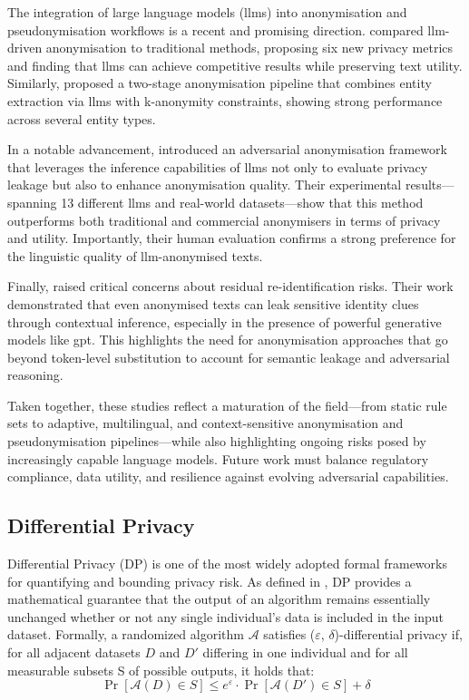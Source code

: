 The integration of large language models (\glspl{llm}) into anonymisation and pseudonymisation workflows is a recent and promising direction. \citet{pissarra2024llm} compared \gls{llm}-driven anonymisation to traditional methods, proposing six new privacy metrics and finding that \glspl{llm} can achieve competitive results while preserving text utility. Similarly, \citet{jia2025twostage} proposed a two-stage anonymisation pipeline that combines entity extraction via \glspl{llm} with k-anonymity constraints, showing strong performance across several entity types.

In a notable advancement, \citet{staabLargeLanguageModels2025} introduced an adversarial anonymisation framework that leverages the inference capabilities of \glspl{llm} not only to evaluate privacy leakage but also to enhance anonymisation quality. Their experimental results—spanning 13 different \glspl{llm} and real-world datasets—show that this method outperforms both traditional and commercial anonymisers in terms of privacy and utility. Importantly, their human evaluation confirms a strong preference for the linguistic quality of \gls{llm}-anonymised texts.

Finally, \citet{patsakis2023gpt} raised critical concerns about residual re-identification risks. Their work demonstrated that even anonymised texts can leak sensitive identity clues through contextual inference, especially in the presence of powerful generative models like \gls{gpt}. This highlights the need for anonymisation approaches that go beyond token-level substitution to account for semantic leakage and adversarial reasoning.

Taken together, these studies reflect a maturation of the field—from static rule sets to adaptive, multilingual, and context-sensitive anonymisation and pseudonymisation pipelines—while also highlighting ongoing risks posed by increasingly capable language models. Future work must balance regulatory compliance, data utility, and resilience against evolving adversarial capabilities.

\subsection{Differential Privacy}
Differential Privacy (DP) is one of the most widely adopted formal frameworks for quantifying and bounding privacy risk. As defined in \citet{dwork2014algorithmic}, DP provides a mathematical guarantee that the output of an algorithm remains essentially unchanged whether or not any single individual’s data is included in the input dataset. Formally, a randomized algorithm $\mathcal{A}$ satisfies ($\varepsilon$, $\delta$)-differential privacy if, for all adjacent datasets $D$ and $D'$ differing in one individual and for all measurable subsets S of possible outputs, it holds that: 
\[\Pr[\mathcal{A}(D) \in S] \leq e^\varepsilon \cdot \Pr[\mathcal{A}(D') \in S] +\delta\]

